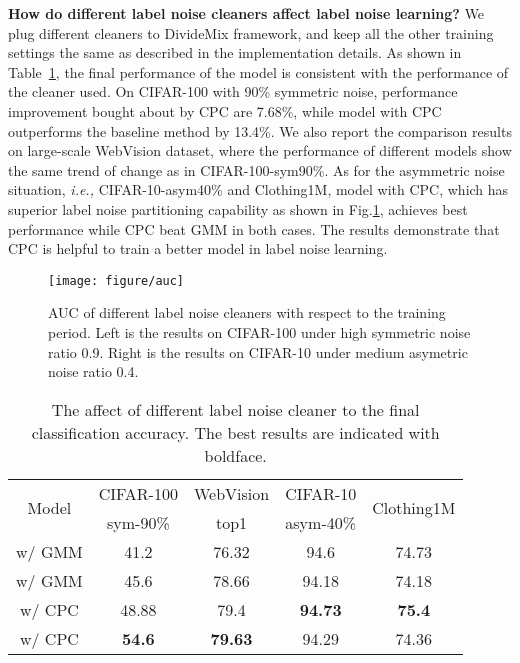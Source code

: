 \documentclass{article} \usepackage{iclr2023_conference,times}
\begin{document}
\textbf{How do different label noise cleaners affect label noise learning?} We plug different cleaners to DivideMix framework, and keep all the other training settings the same as described in the implementation details. As shown in Table~\ref{table-ablation}, the final performance of the model is consistent with the performance of the cleaner used. On CIFAR-100 with 90\% symmetric noise, performance improvement bought about by CPC are 7.68\%, while model with CPC outperforms the baseline method by 13.4\%. We also report the comparison results on large-scale WebVision dataset, where the performance of different models show the same trend of change as in CIFAR-100-sym90\%. As for the asymmetric noise situation, \emph{i.e.,} CIFAR-10-asym40\% and Clothing1M, model with CPC, which has superior label noise partitioning capability as shown in Fig.\ref{fig:auc}, achieves best performance while CPC beat GMM in both cases.  The results demonstrate that CPC is helpful to train a better model in label noise learning.
\begin{figure}[t]
\centering
  \texttt{[image: figure/auc]}
    \vspace{-2\baselineskip}
  \caption{ AUC of different label noise cleaners with respect to the training period. Left is the results on CIFAR-100 under high symmetric noise ratio 0.9. Right is the results on CIFAR-10 under medium asymetric noise ratio 0.4.}
   \vspace{-1\baselineskip}
   \label{fig:auc}
\end{figure}

\begin{table}[t]
\caption{The affect of different label noise cleaner to the final classification accuracy. The best results are indicated with  boldface.}
\label{table-ablation}
\small
\begin{center}
\begin{tabular}{c|c c c c}
\multirow{2}{*}{Model}& \multicolumn{1}{c}{CIFAR-100} & {WebVision} &  CIFAR-10 & \multirow{2}{*}{Clothing1M} \\
 & sym-90\% & top1 & asym-40\%  &\\ \midrule
w/ GMM & 41.2 &76.32 & 94.6 & 74.73  \\
w/ GMM & 45.6 & 78.66 & 94.18 & 74.18 \\
w/ CPC & 48.88  & 79.4 & \textbf{94.73} & \textbf{75.4} \\
w/ CPC & \textbf{54.6}  & \textbf{79.63} & 94.29 & 74.36  \end{tabular}\end{center}
\vspace{-2\baselineskip}
\end{table}
\end{document}
